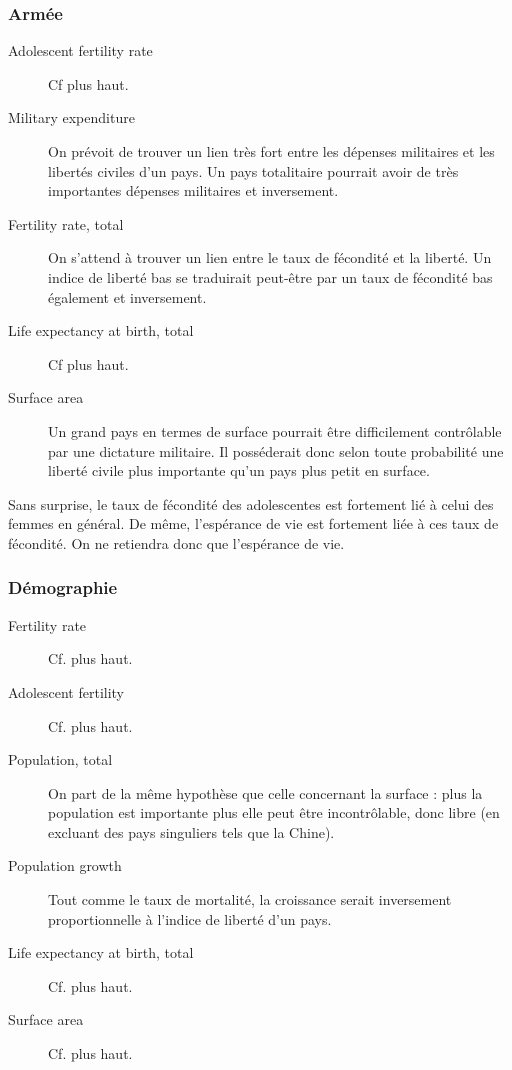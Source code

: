 \subsubsection{Armée}
\begin{description}
\item [Adolescent fertility rate]
Cf plus haut.
\item [Military expenditure]
On prévoit de trouver un lien très fort entre les dépenses militaires et les libertés civiles d'un pays. Un pays totalitaire pourrait avoir de très importantes dépenses militaires et inversement.
\item [Fertility rate, total]
On s'attend à trouver un lien entre le taux de fécondité et la liberté. Un indice de liberté bas se traduirait peut-être par un taux de fécondité bas également et inversement.
\item [Life expectancy at birth, total]
Cf plus haut.
\item [Surface area]
Un grand pays en termes de surface pourrait être difficilement contrôlable par une dictature militaire. Il posséderait donc selon toute probabilité une liberté civile plus importante qu'un pays plus petit en surface.
\end{description}

Sans surprise, le taux de fécondité des adolescentes est fortement lié à celui des femmes en général. De même, l'espérance de vie est fortement liée à ces taux de fécondité. On ne retiendra donc que l'espérance de vie.

\subsubsection{Démographie} 
\begin{description}
\item [Fertility rate]
Cf. plus haut.
\item [Adolescent fertility]
Cf. plus haut.
\item [Population, total]
On part de la même hypothèse que celle concernant la surface : plus la population est importante plus elle peut être incontrôlable, donc libre (en excluant des pays singuliers tels que la Chine).
\item [Population growth]
Tout comme le taux de mortalité, la croissance serait inversement proportionnelle à l'indice de liberté d'un pays.
\item [Life expectancy at birth, total]
Cf. plus haut.
\item [Surface area]
Cf. plus haut.
\end{description}

